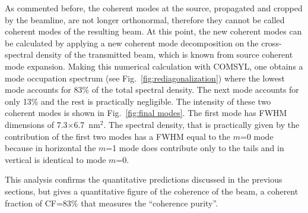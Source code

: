 \documentclass{iucr}              %
\begin{document}
As commented before, the coherent modes at the source, propagated and cropped by the beamline, are not longer orthonormal, therefore they cannot be called coherent modes of the resulting beam. At this point, the new coherent modes can be calculated by applying a new coherent mode decomposition on the cross-spectral density of the transmitted beam, which is known from source coherent mode expansion. Making this numerical calculation with COMSYL, one obtains a mode occupation spectrum (see Fig.~\ref{fig:rediagonalization}) where the lowest mode accounts for 83\% of the total spectral density. The next mode accounts for only 13\% and the rest is practically negligible. The intensity of these two coherent modes is shown in Fig.~\ref{fig:final modes}. The first mode has FWHM dimensions of 7.3$\times$6.7~nm$^2$. The spectral density, that is practically given by the contribution of the first two modes has a FWHM equal to the $m$=0 mode because in horizontal the $m$=1 mode does contribute only to the tails and in vertical is identical to mode $m$=0.

This analysis confirms the quantitative predictions discussed in the previous sections, but gives a quantitative figure of the coherence of the beam, a  coherent fraction of CF=83\% that measures the ``coherence purity''.
\end{document}
